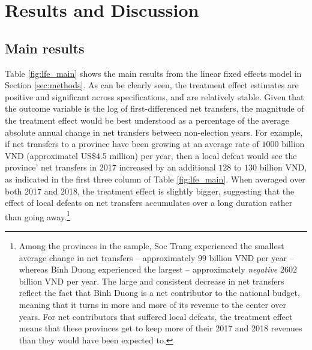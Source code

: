 \documentclass[12pt]{article}
\newcommand{\1}{\mathbbm{1}}
\begin{document}
\section{Results and Discussion}
\label{sec:results}

\subsection{Main results}
\label{sec:results_main}


Table \ref{fig:lfe_main} shows the main results from the linear fixed effects model in Section \ref{sec:methods}. As can be clearly seen, the treatment effect estimates are positive and significant across specifications, and are relatively stable. Given that the outcome variable is the log of first-differenced net transfers, the magnitude of the treatment effect would be best understood as a percentage of the average absolute annual change in net transfers between non-election years. For example, if net transfers to a province have been growing at an average rate of $1000$ billion VND (approximatel US\$4.5 million) per year, then a local defeat would see the province' net transfers in 2017 increased by an additional $128$ to $130$ billion VND, as indicated in the first three column of Table \ref{fig:lfe_main}. When averaged over both 2017 and 2018, the treatment effect is slightly bigger, suggesting that the effect of local defeats on net transfers accumulates over a long duration rather than going away.\footnote{Among the provinces in the sample, Soc Trang experienced the smallest average change in net transfers -- approximately $99$ billion VND per year -- whereas Binh Duong experienced the largest -- approximately \textit{negative} $2602$ billion VND per year. The large and consistent decrease in net transfers reflect the fact that Binh Duong is a net contributor to the national budget, meaning that it turns in more and more of its revenue to the center over years. For net contributors that suffered local defeats, the treatment effect means that these provinces get to keep more of their 2017 and 2018 revenues than they would have been expected to.}
\end{document}

